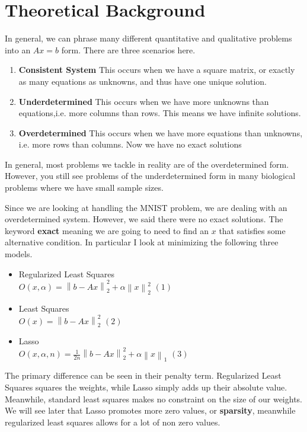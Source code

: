 \documentclass[12pt]{article}
\begin{document}
	\section{Theoretical Background}
	In general, we can phrase many different quantitative and qualitative problems into an $Ax=b$ form. There are three scenarios here.
	\begin{enumerate}
		\item \textbf{Consistent System} This occurs when we have a square matrix, or exactly as many equations as unknowns, and thus have one unique solution.
		\item \textbf{Underdetermined} This occurs when we have more unknowns than equations,i.e. more columns than rows. This means we have infinite solutions.
		\item \textbf{Overdetermined} This occurs when we have more equations than unknowns, i.e. more rows than columns. Now we have no exact solutions 
	\end{enumerate}
	In general, most problems we tackle in reality are of the overdetermined form. However, you still see problems of the underdetermined form in many biological problems where we have small sample sizes. 
	\par
	Since we are looking at handling the MNIST problem, we are dealing with an overdetermined system. However, we said there were no exact solutions. The keyword \textbf{exact} meaning we are going to need to find an $x$ that satisfies some alternative condition. In particular I look at minimizing the following three models.
	\begin{itemize}
		\item Regularized Least Squares
		\\
		$O(x,\alpha) = \left\lVert b-Ax \right\rVert_2^2+\alpha\left\lVert x \right\rVert_2^2$         $(1)$
		\item Least Squares
		\\
		$O(x) = \left\lVert b-Ax \right\rVert_2^2$          $(2)$
		\item Lasso
		\\
		$O(x,\alpha,n) = \frac{1}{2n}\left\lVert b-Ax \right\rVert_2^2+\alpha\left\lVert x \right\rVert_1$         $(3)$
	\end{itemize}
	
	The primary difference can be seen in their penalty term. Regularized Least Squares squares the weights, while Lasso simply adds up their absolute value. Meanwhile, standard least squares makes no constraint on the size of our weights. We will see later that Lasso promotes more zero values, or \textbf{sparsity}, meanwhile regularized least squares allows for a lot of non zero values.
	
\end{document}
